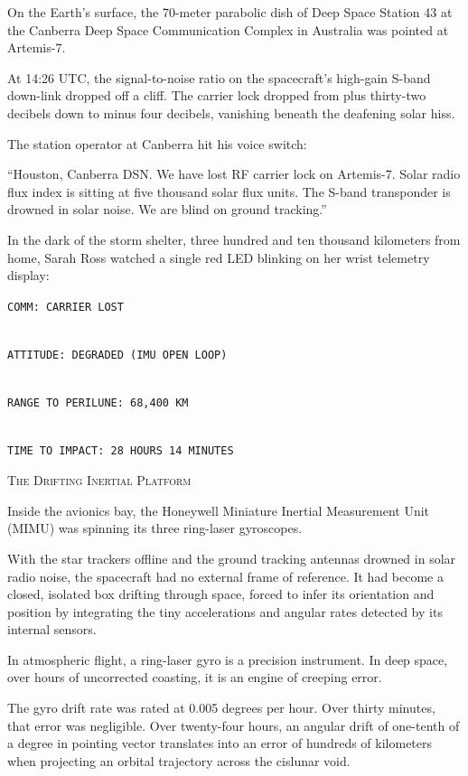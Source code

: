 \documentclass[12pt,twoside,openright]{book}
\newcommand{\sceneheader}[1]{%
  \par\vspace{1.8em}%
  {\noindent\centering\scshape\large #1\par}%
  \vspace{1.0em}%
  \noindent%
}
\newcommand{\dinkus}{%
  \par\vspace{1.2em}%
  {\noindent\centering{\large $\ast\quad\ast\quad\ast$}\par}%
  \vspace{1.2em}%
  \noindent%
}
\begin{document}
On the Earth's surface, the 70-meter parabolic dish of Deep Space
Station 43 at the Canberra Deep Space Communication Complex in Australia
was pointed at Artemis-7.

At 14:26 UTC, the signal-to-noise ratio on the spacecraft's high-gain
S-band down-link dropped off a cliff. The carrier lock dropped from plus
thirty-two decibels down to minus four decibels, vanishing beneath the
deafening solar hiss.

The station operator at Canberra hit his voice switch:

``Houston, Canberra DSN. We have lost RF carrier lock on Artemis-7.
Solar radio flux index is sitting at five thousand solar flux units. The
S-band transponder is drowned in solar noise. We are blind on ground
tracking.''

In the dark of the storm shelter, three hundred and ten thousand
kilometers from home, Sarah Ross watched a single red LED blinking on
her wrist telemetry display:

\passthrough{\lstinline!COMM: CARRIER LOST!}\strut \\
\passthrough{\lstinline!ATTITUDE: DEGRADED (IMU OPEN LOOP)!}\strut \\
\passthrough{\lstinline!RANGE TO PERILUNE: 68,400 KM!}\strut \\
\passthrough{\lstinline!TIME TO IMPACT: 28 HOURS 14 MINUTES!}

\dinkus

\sceneheader{The Drifting Inertial
Platform}

Inside the avionics bay, the Honeywell Miniature Inertial Measurement
Unit (MIMU) was spinning its three ring-laser gyroscopes.

With the star trackers offline and the ground tracking antennas drowned
in solar radio noise, the spacecraft had no external frame of reference.
It had become a closed, isolated box drifting through space, forced to
infer its orientation and position by integrating the tiny accelerations
and angular rates detected by its internal sensors.

In atmospheric flight, a ring-laser gyro is a precision instrument. In
deep space, over hours of uncorrected coasting, it is an engine of
creeping error.

The gyro drift rate was rated at 0.005 degrees per hour. Over thirty
minutes, that error was negligible. Over twenty-four hours, an angular
drift of one-tenth of a degree in pointing vector translates into an
error of hundreds of kilometers when projecting an orbital trajectory
across the cislunar void.
\end{document}
